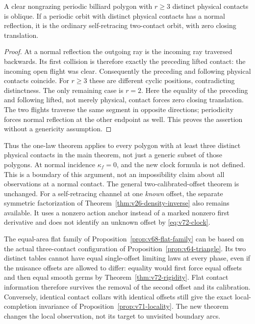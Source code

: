 \begin{lemma}
\label{lem:v72-obliquity}
A clear nongrazing periodic billiard polygon with $r\ge3$ distinct
physical contacts is oblique.  If a periodic orbit with distinct
physical contacts has a normal reflection, it is the ordinary
self-retracing two-contact orbit, with zero closing translation.
\end{lemma}
\begin{proof}
At a normal reflection the outgoing ray is the incoming ray traversed
backwards.  Its first collision is therefore exactly the preceding
lifted contact: the incoming open flight was clear.  Consequently the
preceding and following physical contacts coincide.  For $r\ge3$ these
are different cyclic positions, contradicting distinctness.  The only
remaining case is $r=2$.  Here the equality of the preceding and
following lifted, not merely physical, contact forces zero closing
translation.  The two flights traverse the same segment in opposite
directions; periodicity forces normal reflection at the other endpoint
as well.  This proves the assertion without a genericity assumption.
\end{proof}

Thus the one-law theorem applies to every polygon with at least three
distinct physical contacts in the main theorem, not just a generic
subset of those polygons.  At normal incidence $\kappa_f=0$, and the
new clock formula is not defined.  This is a boundary of this argument,
not an impossibility claim about all observations at a normal contact.
The general two-calibrated-offset theorem is unchanged.  For a
self-retracing channel at one \emph{known} offset, the separate symmetric
factorization of Theorem~\ref{thm:v26-density-inverse} also remains
available.  It uses a nonzero action anchor instead of a marked nonzero
first derivative and does not identify an unknown offset by
\eqref{eq:v72-clock}.

The equal-area flat family of Proposition~\ref{prop:v68-flat-family}
can be based on the actual three-contact configuration of
Proposition~\ref{prop:v64-triangle}.  Its two distinct tables
cannot have equal single-offset limiting laws at every phase, even if
the nuisance offsets are allowed to differ: equality would first force
equal offsets and then equal smooth germs by
Theorem~\ref{thm:v72-rigidity}.  Flat contact information therefore
survives the removal of the second offset and its calibration.
Conversely, identical contact collars with identical offsets still
give the exact local-completion invariance of
Proposition~\ref{prop:v71-locality}.  The new theorem changes the local
observation, not its target to unvisited boundary arcs.

